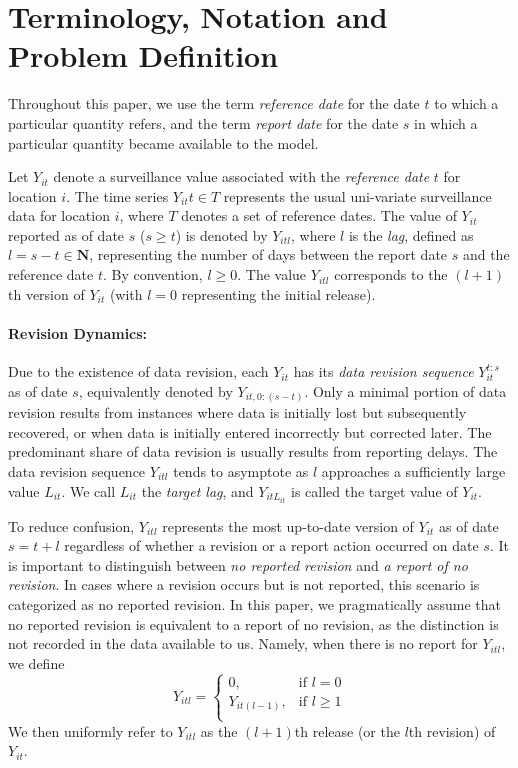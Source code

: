 \section{Terminology, Notation and Problem Definition}

Throughout this paper, we use the term \emph{reference date} for the date $t$ to which a particular quantity refers, and the term \emph{report date} for the date $s$ in which a particular quantity became available to the model.

Let $Y_{it}$ denote a surveillance value associated with the \emph{reference date} $t$ for location $i$. The time series ${Y_{it}}{t \in T}$ represents the usual uni-variate surveillance data for location $i$, where $T$ denotes a set of reference dates. The value of $Y_{it}$ reported as of date $s$ ($s \ge t$) is denoted by $Y_{itl}$, where $l$ is the \emph{lag}, defined as $l = s - t \in \mathbf{N}$, representing the number of days between the report date $s$ and the reference date $t$. By convention, $l \ge 0$. The value $Y_{itl}$ corresponds to the $(l+1)$th version of $Y_{it}$ (with $l=0$ representing the initial release).

\paragraph{Revision Dynamics:} Due to the existence of data revision, each $Y_{it}$ has its \emph{data revision sequence} $Y_{it}^{t:s}$ as of date $s$, equivalently denoted by $Y_{it,0:(s-t)}$. Only a minimal portion of data revision results from instances where data is initially lost but subsequently recovered, or when data is initially entered incorrectly but corrected later. The predominant share of data revision is usually results from reporting delays. The data revision sequence $Y_{itl}$ tends to asymptote as $l$ approaches a sufficiently large value $L_{it}$. We call $L_{it}$ the \emph{target lag}, and $Y_{itL_{it}}$ is called the target value of $Y_{it}$. 

To reduce confusion, $Y_{itl}$ represents the most up-to-date version of $Y_{it}$ as of date $s = t+l$ regardless of whether a revision or a report action occurred on date $s$.  It is important to distinguish between \emph{no reported revision} and \emph{a report of no revision}. In cases where a revision occurs but is not reported, this scenario is categorized as no reported revision. In this paper, we pragmatically assume that no reported revision is equivalent to a report of no revision, as the distinction is not recorded in the data available to us. Namely, when there is no report for $Y_{itl}$, we define 
$$
    Y_{itl}=
\begin{cases}
    0,           & \text{if } l = 0\\
    Y_{it(l-1)}, & \text{if } l\geq 1\\    
\end{cases}
$$
We then uniformly refer to $Y_{itl}$ as the $(l+1)$th release (or the $l$th revision) of $Y_{it}$.

